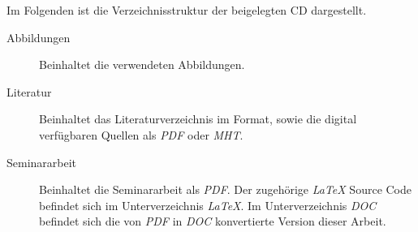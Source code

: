 \label{cha:Beigaben}

Im Folgenden ist die Verzeichnisstruktur der beigelegten CD dargestellt.
 
\begin{description}
	\item[Abbildungen]
		Beinhaltet die verwendeten Abbildungen.
	\item[Literatur]
		Beinhaltet das Literaturverzeichnis im \textit{\BibTeX{}} Format, sowie die digital verfügbaren Quellen als \textit{PDF} oder \textit{MHT}.
	\item[Seminararbeit]
		Beinhaltet die Seminararbeit als \textit{PDF}.
		Der zugehörige \emph{\LaTeX{}} Source Code befindet sich im Unterverzeichnis \textit{LaTeX}.
		Im Unterverzeichnis \textit{DOC} befindet sich die von \textit{PDF} in \textit{DOC} konvertierte Version dieser Arbeit.
\end{description}